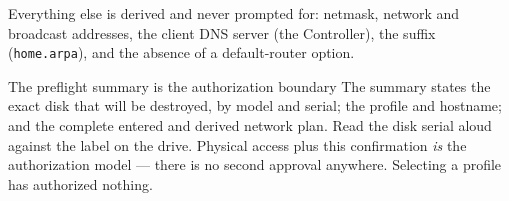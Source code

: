 Everything else is derived and never prompted for: netmask, network and
broadcast addresses, the client DNS server (the Controller), the suffix
(\texttt{home.arpa}), and the absence of a default-router option.

\begin{gate}{The preflight summary is the authorization boundary}
The summary states the exact disk that will be destroyed, by model and serial;
the profile and hostname; and the complete entered and derived network plan.
Read the disk serial aloud against the label on the drive. Physical access plus
this confirmation \emph{is} the authorization model --- there is no second
approval anywhere. Selecting a profile has authorized nothing.
\end{gate}



